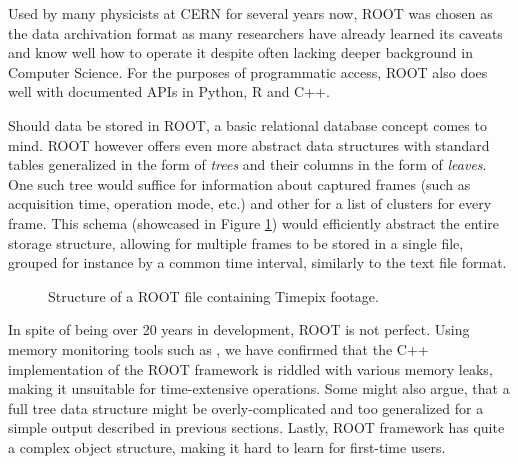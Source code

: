 Used by many physicists at CERN for several years now, ROOT was chosen as the data archivation format as many researchers have already learned its caveats and know well how to operate it despite often lacking deeper background in Computer Science. For the purposes of programmatic access, ROOT also does well with documented APIs in Python, R and C++.

Should data be stored in ROOT, a basic relational database concept comes to mind. ROOT however offers even more abstract data structures with standard tables generalized in the form of \textit{trees} and their columns in the form of \textit{leaves}. One such tree would suffice for information about captured frames (such as acquisition time, operation mode, etc.) and other for a list of clusters for every frame. This schema (showcased in Figure \ref{fig:root-trees}) would efficiently abstract the entire storage structure, allowing for multiple frames to be stored in a single file, grouped for instance by a common time interval, similarly to the text file format.

\begin{figure}[t]
\begin{center}


\caption{Structure of a ROOT file containing Timepix footage.}
\label{fig:root-trees}
\end{center}
\end{figure}

In spite of being over 20 years in development, ROOT is not perfect. Using memory monitoring tools such as \cite{nethercote2007valgrind}, we have confirmed that the C++ implementation of the ROOT framework is riddled with various memory leaks, making it unsuitable for time-extensive operations. Some might also argue, that a full tree data structure might be overly-complicated and too generalized for a simple output described in previous sections. Lastly, ROOT framework has quite a complex object structure, making it hard to learn for first-time users.
